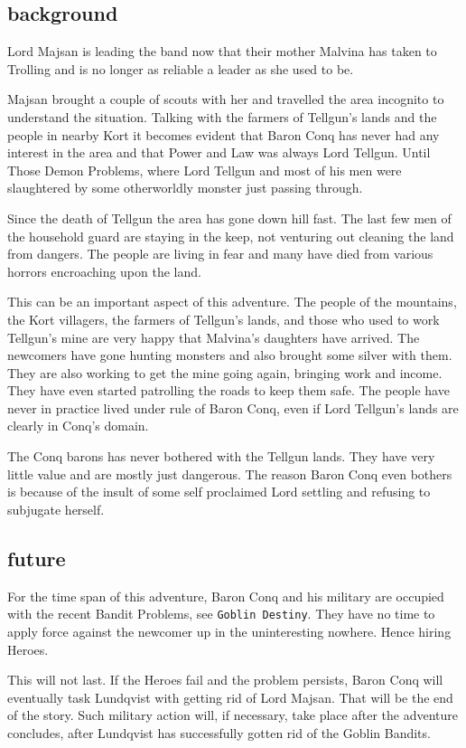 \subsection*{background}
Lord Majsan is leading the band now that their mother Malvina has taken to Trolling and is no longer as reliable a leader as she used to be.

Majsan brought a couple of scouts with her and travelled the area incognito to understand the situation. Talking with the farmers of Tellgun's lands and the people in nearby Kort it becomes evident that Baron Conq has never had any interest in the area and that Power and Law was always Lord Tellgun. Until Those Demon Problems, where Lord Tellgun and most of his men were slaughtered by some otherworldly monster just passing through.

Since the death of Tellgun the area has gone down hill fast. The last few men of the household guard are staying in the keep, not venturing out cleaning the land from dangers. The people are living in fear and many have died from various horrors encroaching upon the land.

This can be an important aspect of this adventure. The people of the mountains, the Kort villagers, the farmers of Tellgun's lands, and those who used to work Tellgun's mine are very happy that Malvina's daughters have arrived. The newcomers have gone hunting monsters and also brought some silver with them. They are also working to get the mine going again, bringing work and income. They have even started patrolling the roads to keep them safe. The people have never in practice lived under rule of Baron Conq, even if Lord Tellgun's lands are clearly in Conq's domain.

The Conq barons has never bothered with the Tellgun lands. They have very little value and are mostly just dangerous. The reason Baron Conq even bothers is because of the insult of some self proclaimed Lord settling and refusing to subjugate herself.


\subsection*{future}
For the time span of this adventure, Baron Conq and his military are occupied with the recent Bandit Problems, see \texttt{Goblin Destiny}. They have no time to apply force against the newcomer up in the uninteresting nowhere. Hence hiring Heroes.

This will not last. If the Heroes fail and the problem persists, Baron Conq will eventually task Lundqvist with getting rid of Lord Majsan. That will be the end of the story. Such military action will, if necessary, take place after the adventure concludes, after Lundqvist has successfully gotten rid of the Goblin Bandits.


